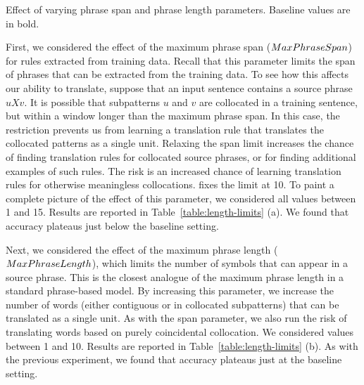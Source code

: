 \figpreamble
\begin{table}
	\begin{center}
		
	\end{center}
	\figpostamble
	\caption{Effect of varying phrase span and phrase length parameters.  
		Baseline values are in bold.}
		\label{table:length-limits}
\end{table}

First, we considered the effect of the maximum phrase span ($MaxPhraseSpan$)
for rules extracted from training data.  Recall that this parameter
limits the span of phrases that can be extracted 
from the training data.  To see how this
affects our ability to translate, suppose that an input
sentence contains a source phrase $uXv$.  It is possible
that subpatterns $u$ and $v$ are collocated in a training
sentence, but within a window longer than the maximum
phrase span.  In this case, the restriction prevents us
from learning a translation rule that translates the 
collocated patterns as a single unit.  Relaxing the span
limit increases the chance of finding translation rules for
collocated source phrases, or for finding additional examples
of such rules.  The risk is an increased chance of learning
translation rules for otherwise meaningless collocations.  
\citet{Chiang:2007:cl} fixes the limit at 10.  To paint a complete picture
of the effect of this parameter, we considered all values
between 1 and 15.  Results are reported in 
Table~\ref{table:length-limits} (a).  We found that accuracy
plateaus just below the baseline setting.

Next, we considered the effect of the maximum phrase 
length ($MaxPhraseLength$), which limits the number of symbols 
that can appear in a source phrase.
This is the closest analogue of the maximum
phrase length in a standard phrase-based model.  By
increasing this parameter, we increase the number of words
(either contiguous or in collocated subpatterns) that can be
translated as a single unit.  As with the span parameter, we
also run the risk of translating words based on purely
coincidental collocation.  We considered values between 1 and 10.
Results are reported in 
Table~\ref{table:length-limits} (b).  As with the 
previous experiment, we found that accuracy
plateaus just at the baseline setting.


